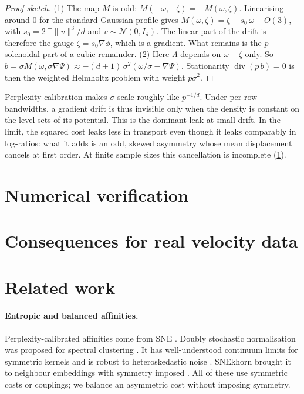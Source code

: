\documentclass{article}
\theoremstyle{plain}
\theoremstyle{definition}
\theoremstyle{remark}
\newcommand{\1}{\mathbf{1}}
\newcommand{\dv}{\operatorname{div}}
\newcommand{\E}{\mathbb{E}}
\begin{document}
\begin{proof}[Proof sketch]
  (1) The map $M$ is odd: $M(-\omega,-\zeta)=-M(\omega,\zeta)$.
  Linearising around $0$ for the standard Gaussian profile gives
  $M(\omega,\zeta)=\zeta-s_0\,\omega+O(3)$, with
  $s_0=2\,\E\|v\|^3/d$ and $v\sim\mathcal{N}(0,I_d)$. The linear part of
  the drift is therefore the gauge $\zeta=s_0\nabla\phi$, which is a
  gradient. What remains is the $p$-solenoidal part of a cubic remainder.
  (2) Here $\Lambda$ depends on $\omega-\zeta$ only. So
  $b=\sigma M(\omega,\sigma\nabla\Psi)\approx-(d+1)\,\sigma^2(\omega/\sigma-\nabla\Psi)$.
  Stationarity $\dv(p\,b)=0$ is then the weighted Helmholtz problem with
  weight $p\sigma^2$.
\end{proof}

Perplexity calibration makes $\sigma$ scale roughly like $p^{-1/d}$.
Under per-row bandwidths, a gradient drift is thus invisible only when the
density is constant on the level sets of its potential. This is the
dominant leak at small drift. In the limit, the squared cost leaks less in
transport even though it leaks comparably in log-ratios: what it adds is an
odd, skewed asymmetry whose mean displacement cancels at first order. At
finite sample sizes this cancellation is incomplete (\cref{sec:exp}).

\section{Numerical verification}
\label{sec:exp}



\section{Consequences for real velocity data}
\label{sec:real}



\section{Related work}
\label{sec:related}

\paragraph{Entropic and balanced affinities.}
Perplexity-calibrated affinities come from SNE
\citep{hinton2002sne,vandermaaten2008tsne,vladymyrov2013entropic}. Doubly
stochastic normalisation was proposed for spectral clustering
\citep{zass2006doubly}. It has well-understood continuum limits for
symmetric kernels \citep{marshall2019manifold} and is robust to
heteroskedastic noise \citep{landa2021doubly}. SNEkhorn brought it to
neighbour embeddings with symmetry imposed \citep{vanassel2023snekhorn}.
All of these use symmetric costs or couplings; we balance an asymmetric
cost without imposing symmetry.
\end{document}
